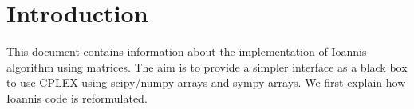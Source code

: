 \documentclass[
10pt, %
letter, %
oneside, %
BCOR02mm, %
]{scrartcl}
\begin{document}



\newpage %


\section{Introduction}
This document contains information about the implementation of Ioannis algorithm using matrices. The aim is to provide a simpler interface as a black box to use CPLEX using scipy/numpy arrays and sympy arrays.
We first explain how Ioannis code is reformulated. 
\end{document}
